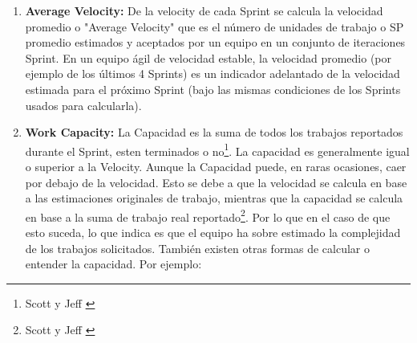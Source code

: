 \begin{enumerate}
\begin{enumerate}
  \item{\textbf{Velocity en nueva funcionalidad:} cuando la velocidad muestra solo la cantidad de funcionalidad de valor para el negocio que un equipo entrega (aceptada) en un sprint. En este sentido, las historias de usuarios que no tienen ningún valor para el cliente o incompletas, las correcciones de errores y las refactorizaciones no cuentan en la velocidad\footnote{\cite{David-Koontz-2014}}. En este caso, la velocidad del equipo da un indicio sobre el valor de negocio entregado por el equipo. En Scrum original o clásico se sobre-entiende que las historias son las que aportan valor, por tal motivo a veces no se aclara explícitamente esto.
  }
  
  \item{\textbf{Value Velocity:} es una forma interesante para medir la productividad (sugerida por James Shore\footnote{\cite{James-Shore-2015}}) similar a la velocidad tradicional o velocidad de trabajo, excepto que se basa en estimaciones de valor de negocio (Business Value Point) hechas por el PO antes de la planeación.
  }
  
  \end{enumerate}

\item {\textbf{Average Velocity:} De la velocity de cada Sprint se calcula la velocidad promedio o "Average Velocity" que es el número de unidades de trabajo o SP promedio estimados y aceptados por un equipo en un conjunto de iteraciones Sprint. En un equipo ágil de velocidad estable, la velocidad promedio (por ejemplo de los últimos 4 Sprints) es un indicador adelantado de la velocidad estimada para el próximo Sprint (bajo las mismas condiciones de los Sprints usados para calcularla).}

\item {\textbf{Work Capacity:} La Capacidad es la suma de todos los trabajos reportados durante el Sprint, esten terminados o no\footnote{Scott y Jeff \cite{Scott-Jeff-2013}}. La capacidad es generalmente igual o superior a la Velocity. Aunque la Capacidad puede, en raras ocasiones, caer por debajo de la velocidad. Esto se debe a que la velocidad se calcula en base a las estimaciones originales de trabajo, mientras que la capacidad se calcula en base a la suma de trabajo real reportado\footnote{Scott y Jeff \cite{Scott-Jeff-2013}}. Por lo que en el caso de que esto suceda, lo que indica es que el equipo ha sobre estimado la complejidad de los trabajos solicitados. También existen otras formas de calcular o entender la capacidad. Por ejemplo:

}
\end{enumerate}
